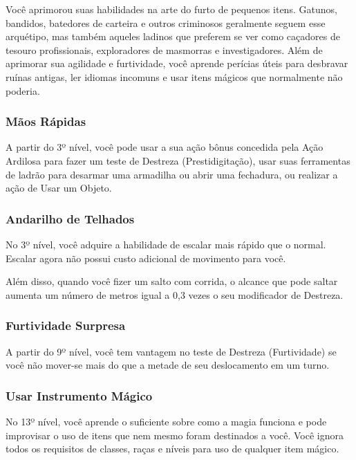 \documentclass{RPG_Adventure}[2021/10/20]
\begin{document}
Você aprimorou suas habilidades na arte do furto de pequenos itens. Gatunos,
bandidos, batedores de carteira e outros criminosos geralmente seguem esse
arquétipo, mas também aqueles ladinos que preferem se ver como caçadores de
tesouro profissionais, exploradores de masmorras e investigadores. Além de
aprimorar sua agilidade e furtividade, você aprende perícias úteis para
desbravar ruínas antigas, ler idiomas incomuns e usar itens mágicos que
normalmente não poderia.

\subsubsection{Mãos Rápidas}%

A partir do 3º nível, você pode usar a sua ação bônus concedida pela Ação
Ardilosa para fazer um teste de Destreza (Prestidigitação), usar suas
ferramentas de ladrão para desarmar uma armadilha ou abrir uma fechadura, ou
realizar a ação de Usar um Objeto.

\subsubsection{Andarilho de Telhados}%

No 3º nível, você adquire a habilidade de escalar mais rápido que o normal.
Escalar agora não possui custo adicional de movimento para você.

Além disso, quando você fizer um salto com corrida, o alcance que pode saltar
aumenta um número de metros igual a 0,3 vezes o seu modificador de Destreza.

\subsubsection{Furtividade Surpresa}%

A partir do 9º nível, você tem vantagem no teste de Destreza (Furtividade) se
você não mover-se mais do que a metade de seu deslocamento em um turno.

\subsubsection{Usar Instrumento Mágico}%

 No 13º nível, você aprende o suficiente sobre como a magia funciona e pode
 improvisar o uso de itens que nem mesmo foram destinados a você. Você ignora
 todos os requisitos de classes, raças e níveis para uso de qualquer item
 mágico.
\end{document}
